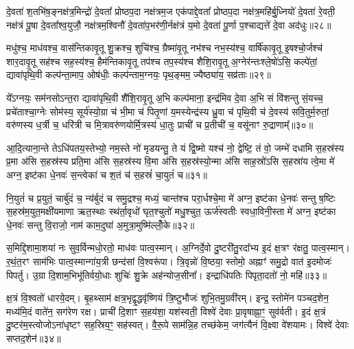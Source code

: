 दे॒वता॑ श॒तभि॑ष॒ङ्नक्ष॑त्र॒मिन्द्रो॑ दे॒वता᳚ प्रोष्ठप॒दा नक्ष॑त्रम॒ज एक॑पाद्दे॒वता᳚ प्रोष्ठप॒दा नक्ष॑त्र॒महि॑र्बु॒ध्नियो॑ दे॒वता॑ रे॒वती॒ नक्ष॑त्रं पू॒षा दे॒वता᳚श्व॒युजौ॒ नक्ष॑त्रम॒श्विनौ॑ दे॒वता॑प॒भर॑णी॒र्नक्ष॑त्रं य॒मो दे॒वता॑ पू॒र्णा प॒श्चाद्यत्ते॑ दे॒वा अद॑धुः॥२८॥

{\anuvakamend[{फल्गु॑नी॒ नक्ष॑त्रं॒ वस॑व॒स्त्रय॑स्त्रिꣳशच्च॥10॥}]}

मधु॑श्च॒ माध॑वश्च॒ वास॑न्तिकावृ॒तू शु॒क्रश्च॒ शुचि॑श्च॒ ग्रैष्मा॑वृ॒तू नभ॑श्च नभ॒स्य॑श्च॒ वार्\mbox{}षि॑कावृ॒तू इ॒षश्चो॒र्जश्च॑ शार॒दावृ॒तू सह॑श्च सह॒स्य॑श्च॒ हैम॑न्तिकावृ॒तू तप॑श्च तप॒स्य॑श्च शैशि॒रावृ॒तू अ॒ग्नेर॑न्तःश्ले॒षो॑\-ऽसि॒ कल्पे॑तां॒ द्यावा॑पृथि॒वी कल्प॑न्ता॒माप॒ ओष॑धीः॒ कल्प॑न्ताम॒ग्नयः॒ पृथ॒ङ्मम॒ ज्यैष्ठ्या॑य॒ सव्र॑ताः॥२९॥

ये᳚\-ऽग्नयः॒ सम॑नसो\-ऽन्त॒रा द्यावा॑पृथि॒वी शै॑शि॒रावृ॒तू अ॒भि कल्प॑माना॒ इन्द्र॑मिव दे॒वा अ॒भि सं वि॑शन्तु सं॒यच्च॒ प्रचे॑ताश्चा॒ग्नेः सोम॑स्य॒ सूर्य॑स्यो॒ग्रा च॑ भी॒मा च॑ पितृ॒णां य॒मस्येन्द्र॑स्य ध्रु॒वा च॑ पृथि॒वी च॑ दे॒वस्य॑ सवि॒तुर्म॒रुतां॒ वरु॑णस्य ध॒र्त्री च॒ धरि॑त्री च मि॒त्रावरु॑णयोर्मि॒त्रस्य॑ धा॒तुः प्राची॑ च प्र॒तीची॑ च॒ वसू॑नाꣳ रु॒द्राणाम्᳚॥३०॥

आ॒दि॒त्याना॒न्ते ते\-ऽधि॑पतय॒स्तेभ्यो॒ नम॒स्ते नो॑ मृडयन्तु॒ ते यं द्वि॒ष्मो यश्च॑ नो॒ द्वेष्टि॒ तं वो॒ जम्भे॑ दधामि स॒हस्र॑स्य प्र॒मा अ॑सि स॒हस्र॑स्य प्रति॒मा अ॑सि स॒हस्र॑स्य वि॒मा अ॑सि स॒हस्र॑स्यो॒न्मा अ॑सि साह॒स्रो॑\-ऽसि स॒हस्रा॑य त्वे॒मा मे॑ अग्न॒ इष्ट॑का धे॒नवः॑ स॒न्त्वेका॑ च श॒तं च॑ स॒हस्रं॑ चा॒युतं॑ च॥३१॥

नि॒युतं॑ च प्र॒युतं॒ चार्बु॑दं च॒ न्य॑र्बुदं च समु॒द्रश्च॒ मध्यं॒ चान्त॑श्च परा॒र्धश्चे॒मा मे॑ अग्न॒ इष्ट॑का धे॒नवः॑ सन्तु ष॒ष्टिः स॒हस्र॑म॒युत॒मक्षी॑यमाणा ऋत॒स्थाः स्थ॑र्ता॒वृधो॑ घृत॒श्चुतो॑ मधु॒श्चुत॒ ऊर्ज॑स्वतीः स्वधा॒विनी॒स्ता मे॑ अग्न॒ इष्ट॑का धे॒नवः॑ सन्तु वि॒राजो॒ नाम॑ काम॒दुघा॑ अ॒मुत्रा॒मुष्मि॑ल्लोँ॒के॥३२॥

{\anuvakamend[{सव्र॑ता रु॒द्राणा॑म॒युतं॑ च॒ पञ्च॑चत्वारिꣳशच्च॥11॥}]}

स॒मिद्दि॒शामा॒शया॑ नः सुव॒र्विन्मधो॒रतो॒ माध॑वः पात्व॒स्मान्। अ॒ग्निर्दे॒वो दु॒ष्टरी॑तु॒रदा᳚भ्य इ॒दं क्ष॒त्रꣳ र॑क्षतु॒ पात्व॒स्मान्। र॒थं॒त॒रꣳ साम॑भिः पात्व॒स्मान्गा॑य॒त्री छन्द॑सां वि॒श्वरू॑पा। त्रि॒वृन्नो॑ वि॒ष्ठया॒ स्तोमो॒ अह्नाꣳ॑ समु॒द्रो वात॑ इ॒दमोजः॑ पिपर्तु। उ॒ग्रा दि॒शाम॒भिभू॑तिर्वयो॒धाः शुचिः॑ शु॒क्रे अह॑न्योज॒सीना᳚। इन्द्राधि॑पतिः पिपृता॒दतो॑ नो॒ महि॑॥३३॥

क्ष॒त्रं वि॒श्वतो॑ धारये॒दम्। बृ॒हथ्साम॑ क्षत्र॒भृद्वृ॒द्धवृ॑ष्णियं त्रि॒ष्टुभौजः॑ शुभि॒तमु॒ग्रवी॑रम्। इन्द्र॒ स्तोमे॑न पञ्चद॒शेन॒ मध्य॑मि॒दं वाते॑न॒ सग॑रेण रक्ष। प्राची॑ दि॒शाꣳ स॒हय॑शा॒ यश॑स्वती॒ विश्वे॑ देवाः प्रा॒वृषाह्ना॒ꣳ॒ सुव॑र्वती। इ॒दं क्ष॒त्रं दु॒ष्टर॑म॒स्त्वोजो\-ऽना॑धृष्टꣳ सह॒स्रिय॒ꣳ॒ सह॑स्वत्। वै॒रू॒पे साम॑न्नि॒ह तच्छ॑केम॒ जग॑त्यैनं वि॒क्ष्वा वे॑शयामः। विश्वे॑ देवाः सप्तद॒शेन॑॥३४॥

